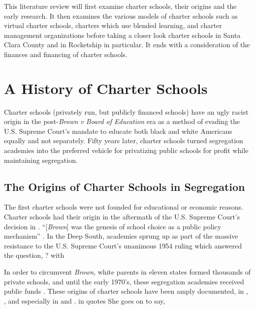 This literature review will first examine charter schools, their origins and the early research. It then examines the various models of charter schools such as virtual charter schools, charters which use blended learning, and charter management organizations before taking a closer look charter schools in Santa Clara County and in Rocketship in particular. It ends with a consideration of the finances and financing of charter schools.

\newpage
\section{A History of Charter Schools}\label{sec:cs-history}\indent

Charter schools (privately run, but publicly financed schools) have an ugly racist origin in the post-\textit{Brown v Board of Education} era as a method of evading the U.S. Supreme Court's mandate to educate both black and white Americans equally and not separately. Fifty years later, charter schools turned segregation academies into the preferred vehicle for privatizing public schools for profit while maintaining segregation.

\subsection{The Origins of Charter Schools in Segregation}\label{sec:origins}\indent

The first charter schools were not founded for educational or economic reasons. Charter schools had their origin in the aftermath of the U.S. Supreme Court's decision in \textcite{Warren1954}. ``[\textit{Brown}] was the genesis of school choice as a public policy mechanism'' \parencite[8]{Garcia2018}. In the Deep South, academies sprung up as part of the massive resistance to the U.S. Supreme Court's unanimous 1954 ruling which answered the question,
?
with  %

In order to circumvent \textit{Brown}, white parents in eleven states formed thousands of private schools, and until the early 1970's, these segregation academies received public funds \parencite[81]{Rooks2017}. These origins of  charter schools have been amply documented, in \textcite{Frankenberg.etal2010}, \textcite{Frankenberg.etal2011}, and especially in \textcite{Suitts2019} and \textcite{Suitts2020}. \citeauthor{Alexander2011} in  quotes \textcite[52]{Rosenberg1991}  She goes on to say,

